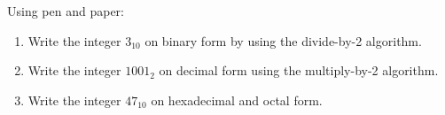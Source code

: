 Using pen and paper:
\begin{enumerate}[label=\alph*)]
\item Write the integer $3_{10}$ on binary form by using the divide-by-2 algorithm.
\item Write the integer $1001_2$ on decimal form using the multiply-by-2 algorithm.
\item Write the integer $47_{10}$ on hexadecimal and octal form.
\end{enumerate}
